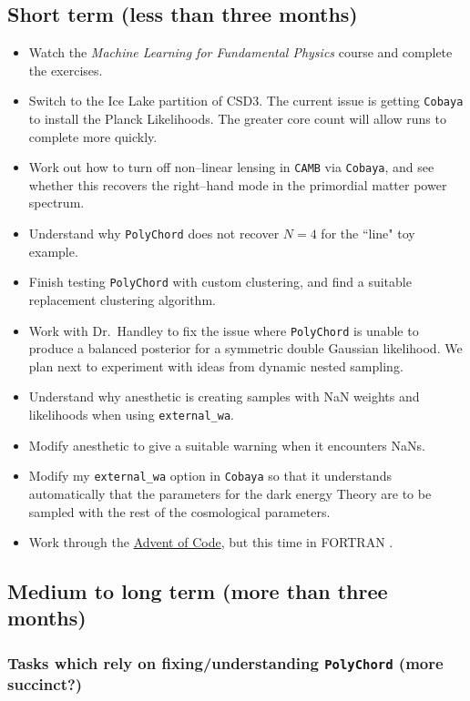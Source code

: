 \documentclass{article}
\begin{document}
\subsection{Short term (less than three months)}
\begin{itemize}
  \item Watch the \textit{Machine Learning for Fundamental Physics} course and complete the exercises.
  \item Switch to the Ice Lake partition of CSD3. The current issue is getting \texttt{Cobaya} to install the Planck Likelihoods. The greater core count will allow runs to complete more quickly.
  \item Work out how to turn off non--linear lensing in \texttt{CAMB} via \texttt{Cobaya}, and see whether this recovers the right--hand mode in the primordial matter power spectrum. 
  \item Understand why \texttt{PolyChord} does not recover $N=4$ for the ``line" toy example.
  \item Finish testing \texttt{PolyChord} with custom clustering, and find a suitable replacement clustering algorithm.
  \item Work with Dr.~Handley to fix the issue where \texttt{PolyChord} is unable to produce a balanced posterior for a symmetric double Gaussian likelihood. We plan next to experiment with ideas from dynamic nested sampling.
  \item Understand why anesthetic is creating samples with NaN weights and likelihoods when using \newline \texttt{external\_wa}.
  \item Modify anesthetic to give a suitable warning when it encounters NaNs.
  \item Modify my \texttt{external\_wa} option in \texttt{Cobaya} so that it understands automatically that the parameters for the dark energy Theory are to be sampled with the rest of the cosmological parameters.
  \item Work through the \href{https://adventofcode.com}{Advent of Code}, but this time in FORTRAN \cite{advent}.
\end{itemize}
\subsection{Medium to long term (more than three months)}

\subsubsection{Tasks which rely on fixing/understanding \texttt{PolyChord} (more succinct?)}
\end{document}
